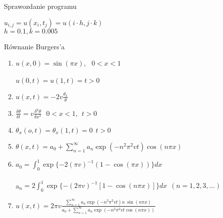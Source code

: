 \documentclass[12pt, a4paper]{report}
\begin{document}
	
	\begin{center}
		\large{Sprawozdanie programu}
	\end{center}
	
	$u_{i,j}=u(x_{i},t_{j})=u(i\cdot h,j\cdot k)$\\
	$h=0.1, k=0.005$\\
	
	
	\begin{center}
		\large{Równanie Burgers'a}
	\end{center}
	
	\begin{enumerate}
		\item$u(x,0)=\sin(\pi x),\ \ \ 0<x<1$\\\\
		$u(0,t)=u(1,t)=t>0$
		
		\item$u(x,t)=-2v\frac{\theta_x}{\theta}$
		
		\item$\frac{\delta\theta}{\delta t}=v\frac{\delta^2\theta}{\delta x^2}\ \ \ 0<x<1,\ \ t>0$
		
		\item$\theta_x(o,t)=\theta_x(1,t)=0\ \ t>0$
		
		\item $\theta(x,t)=a_0+\sum_{n=1}^{\infty}a_n\exp(-n^2\pi^2 vt)\cos(n\pi x)$
		
		\item $a_0=\int_{0}^{1}\exp\{-2(\pi v)^{-1}\left(1-\cos(\pi x)\right)\}dx$\\\\
		a$_n=2\int_{0}^{1}\exp\{-(2\pi v)^{-1}\left[1-\cos(n\pi x)\right]\}dx\ \ (n=1,2,3,\ldots)$
		
		\item $u(x,t)=2\pi v\frac{\sum_{n=1}^{\infty}a_n\exp(-n^2\pi^2 vt)n\ \sin(n\pi x)}{a_0+\sum_{n=1}^{\infty}a_n\exp(-n^2\pi^2 vt\cos(n\pi x))}$
		
	\end{enumerate}
	
	
	
\end{document}
